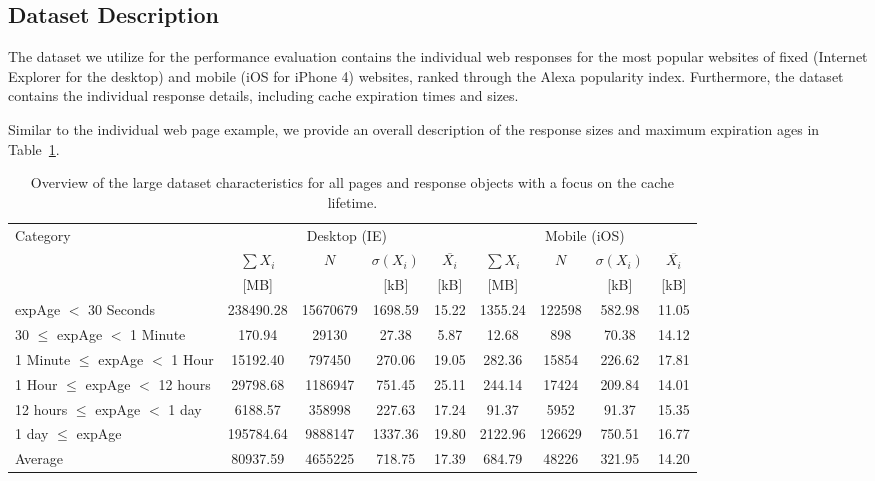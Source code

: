 \documentclass[letterpaper,conference]{IEEEtran}
\begin{document}
\subsection{Dataset Description}
The dataset we utilize for the performance evaluation contains the individual web responses for the most popular websites of fixed (Internet Explorer for the desktop) and mobile (iOS for iPhone 4) websites, ranked through the Alexa popularity index.
Furthermore, the dataset contains the individual response details, including cache expiration times and sizes. 

Similar to the individual web page example, we provide an overall description of the response sizes and maximum expiration ages in Table~\ref{tab:dataset}.
\begin{table}
\centering
\caption{Overview of the large dataset characteristics for all pages and response objects with a focus on the cache lifetime.}
\label{tab:dataset}
\begin{tabular}{|l||c|c|c|c||c|c|c|c|}
	\hline
	Category                         & \multicolumn{4}{|c||}{Desktop (IE)}                       & \multicolumn{4}{|c|}{Mobile (iOS)}                      \\
	                                 & $\sum X_i $ &   $N$    & $\sigma(X_i)$ & $\overline{X_i}$ & $\sum X_i $ &  $N$   & $\sigma(X_i)$ & $\overline{X_i}$ \\
	                                 &    [MB]     &          &     [kB]      &       [kB]       &    [MB]     &        &     [kB]      &       [kB]       \\ \hline\hline
	expAge $<$ 30 Seconds            &  238490.28  & 15670679 &    1698.59    &      15.22       &   1355.24   & 122598 &    582.98     &      11.05       \\ \hline
	30 $\le$ expAge $<$ 1 Minute     &   170.94    &  29130   &     27.38     &       5.87       &    12.68    &  898   &     70.38     &      14.12       \\ \hline
	1 Minute $\le$ expAge $<$ 1 Hour &  15192.40   &  797450  &    270.06     &      19.05       &   282.36    & 15854  &    226.62     &      17.81       \\ \hline
	1 Hour $\le$ expAge $<$ 12 hours &  29798.68   & 1186947  &    751.45     &      25.11       &   244.14    & 17424  &    209.84     &      14.01       \\ \hline
	12 hours $\le$ expAge $<$ 1 day  &   6188.57   &  358998  &    227.63     &      17.24       &    91.37    &  5952  &     91.37     &      15.35       \\ \hline
	1 day $\le$ expAge               &  195784.64  & 9888147  &    1337.36    &      19.80       &   2122.96   & 126629 &    750.51     &      16.77       \\ \hline\hline
	Average                          &  80937.59   & 4655225  &    718.75     &      17.39       &   684.79    & 48226  &    321.95     &      14.20       \\ \hline
\end{tabular}
\end{table}
\end{document}
